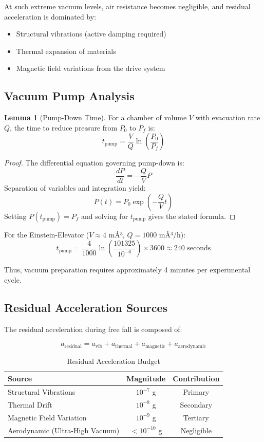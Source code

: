 ﻿\documentclass[a4paper,12pt]{article}
\theoremstyle{definition}
\newtheorem{lemma}{Lemma}
\begin{document}
At such extreme vacuum levels, air resistance becomes negligible, and residual acceleration is dominated by:
\begin{itemize}
	\item Structural vibrations (active damping required)
	\item Thermal expansion of materials
	\item Magnetic field variations from the drive system
\end{itemize}

\subsection{Vacuum Pump Analysis}

\begin{lemma}[Pump-Down Time]
For a chamber of volume $V$ with evacuation rate $Q$, the time to reduce pressure from $P_0$ to $P_f$ is:
\[
t_{\text{pump}} = \frac{V}{Q} \ln\left(\frac{P_0}{P_f}\right)
\]
\end{lemma}

\begin{proof}
The differential equation governing pump-down is:
\[
\frac{dP}{dt} = -\frac{Q}{V} P
\]
Separation of variables and integration yield:
\[
P(t) = P_0 \exp\left(-\frac{Q}{V}t\right)
\]
Setting $P(t_{\text{pump}}) = P_f$ and solving for $t_{\text{pump}}$ gives the stated formula. \qedhere
\end{proof}

For the Einstein-Elevator ($V \approx 4$ mÂ³, $Q = 1000$ mÂ³/h):
\[
t_{\text{pump}} = \frac{4}{1000} \ln\left(\frac{101325}{10^{-6}}\right) \times 3600 \approx 240 \text{ seconds}
\]

Thus, vacuum preparation requires approximately 4 minutes per experimental cycle.

\subsection{Residual Acceleration Sources}

The residual acceleration during free fall is composed of:

\begin{equation}
a_{\text{residual}} = a_{\text{vib}} + a_{\text{thermal}} + a_{\text{magnetic}} + a_{\text{aerodynamic}}
\end{equation}

\begin{table}[h]
\centering
\begin{tabular}{|l|c|c|}
\hline
\textbf{Source} & \textbf{Magnitude} & \textbf{Contribution} \\
\hline
Structural Vibrations & $10^{-7}$ g & Primary \\
Thermal Drift & $10^{-8}$ g & Secondary \\
Magnetic Field Variation & $10^{-9}$ g & Tertiary \\
Aerodynamic (Ultra-High Vacuum) & $< 10^{-10}$ g & Negligible \\
\hline
\end{tabular}
\caption{Residual Acceleration Budget}
\end{table}
\end{document}
